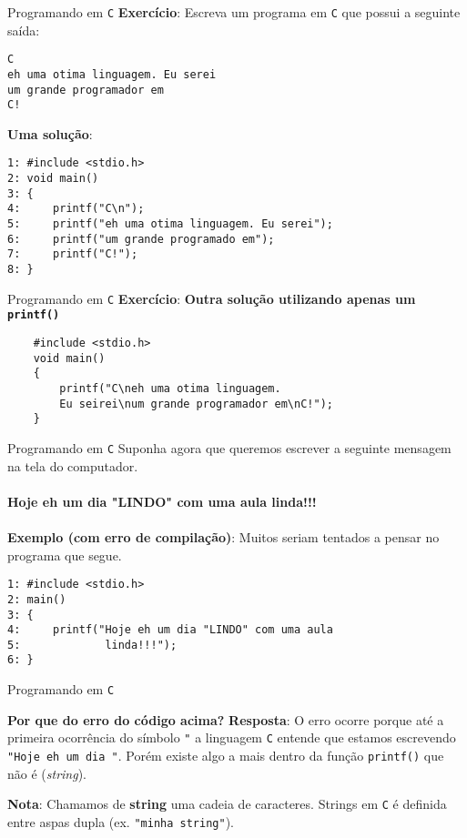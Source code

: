 \documentclass{beamer}
\newcommand{\C}{\texttt{C}}
\begin{document}
\begin{frame}[fragile]{Programando em \C}
\textbf{Exercício}: Escreva um programa em \texttt{C} que possui a seguinte saída:

\begin{verbatim}
C
eh uma otima linguagem. Eu serei
um grande programador em
C!
\end{verbatim}
\pause \textbf{Uma solução}: 
\begin{verbatim}
1: #include <stdio.h>
2: void main()
3: {
4:     printf("C\n");
5:     printf("eh uma otima linguagem. Eu serei");
6:     printf("um grande programado em");
7:     printf("C!");
8: }
\end{verbatim}
\end{frame}

\begin{frame}[fragile]{Programando em \C}
	\textbf{Exercício}:
	\pause \textbf{Outra solução utilizando apenas um \texttt{printf()}}
	\begin{verbatim}
	#include <stdio.h>
	void main()
	{
	    printf("C\neh uma otima linguagem.
	    Eu seirei\num grande programador em\nC!");
	}
	\end{verbatim}
\end{frame}

\begin{frame}[fragile]{Programando em \C}
Suponha agora que queremos escrever a seguinte mensagem na tela do computador.\\~\\

\pause \textbf{Hoje eh um dia "LINDO" com uma aula linda!!!}\\~\\

\pause \textbf{Exemplo (com erro de compilação)}: Muitos seriam tentados a pensar no programa que segue.
\begin{verbatim}
1: #include <stdio.h>
2: main()
3: {
4:     printf("Hoje eh um dia "LINDO" com uma aula
5:             linda!!!");
6: }
\end{verbatim}
\end{frame}

\begin{frame}{Programando em \C}
\begin{block}{\textbf{Por que do erro do código acima?}}
\textbf{Resposta}: O erro ocorre porque até a primeira ocorrência do símbolo \texttt{"} a linguagem \texttt{C} entende que estamos escrevendo \texttt{"Hoje eh um dia "}. Porém existe algo a mais dentro da função \texttt{printf()} que não é (\textit{string}). 
\end{block}
\vspace{0.5cm}
\textbf{Nota}: Chamamos de \textbf{string} uma cadeia de caracteres. Strings em \texttt{C} é definida entre aspas dupla (ex. \texttt{"minha string"}).
\end{frame}
\end{document}
